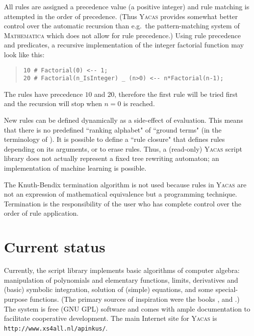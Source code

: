 \documentclass{llncs}
\begin{document}
All rules are assigned a precedence value (a positive integer) and
rule matching is attempted in the order of precedence. (Thus \textsc{Yacas} provides somewhat better control
over the automatic recursion than e.g.~the pattern-matching system of \textsc{Mathematica}
which does not allow for rule precedence.)
Using rule precedence and predicates, a
recursive implementation of the integer factorial function may look like this:
%
\begin{quote}\small\begin{verbatim}
10 # Factorial(0) <-- 1;
20 # Factorial(n_IsInteger) _ (n>0) <-- n*Factorial(n-1);
\end{verbatim}\end{quote}
%
The rules have precedence $10$ and $20$, therefore the first rule will be tried first and the recursion will stop when $n = 0$ is reached.

New rules can be defined dynamically as a side-effect of evaluation.
This means that there is no predefined ``ranking alphabet" of ``ground terms"
(in the terminology of \cite{TATA99}). It is possible to define a ``rule closure"
that defines rules depending on its arguments, or to erase rules. Thus, a
(read-only) \textsc{Yacas} script library does not actually represent a
fixed tree rewriting automaton; an implementation of machine learning is
possible.


The Knuth-Bendix termination algorithm \cite{KB70} is not used because rules in \textsc{Yacas} are not an expression of mathematical equivalence but a programming technique. Termination is the responsibility of the user who has complete control over the order of rule application.


\section{Current status}

Currently, the script library implements basic algorithms of computer algebra:
manipulation of polynomials and elementary functions, limits, derivatives and
(basic) symbolic integration, solution of (simple) equations, and some special-purpose
functions. (The primary sources of inspiration were the books \cite{K98}, \cite{GG99} and
\cite{B86}.) The system is free (GNU GPL) software and comes with ample documentation to facilitate cooperative development. The main Internet site for \textsc{Yacas} is \texttt{http://www.xs4all.nl/\homedir apinkus/}.
\end{document}
